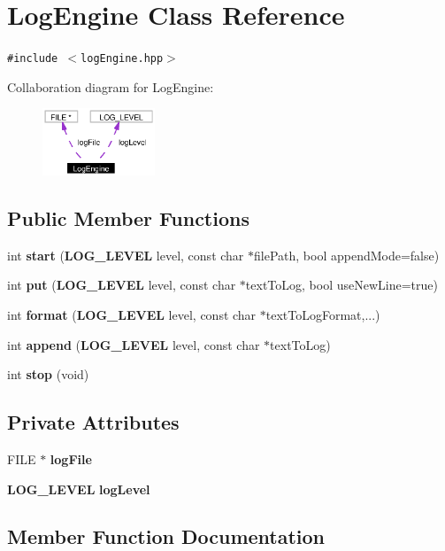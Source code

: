 \section{Log\-Engine Class Reference}
\label{classLogEngine}
{\tt \#include $<$log\-Engine.hpp$>$}

Collaboration diagram for Log\-Engine:\begin{figure}[H]
\begin{center}
\leavevmode
\includegraphics[width=95pt]{classLogEngine__coll__graph}
\end{center}
\end{figure}
\subsection*{Public Member Functions}
\begin{CompactItemize}
\item 
int {\bf start} ({\bf LOG\_\-LEVEL} level, const char $\ast$file\-Path, bool append\-Mode=false)
\item 
int {\bf put} ({\bf LOG\_\-LEVEL} level, const char $\ast$text\-To\-Log, bool use\-New\-Line=true)
\item 
int {\bf format} ({\bf LOG\_\-LEVEL} level, const char $\ast$text\-To\-Log\-Format,...)
\item 
int {\bf append} ({\bf LOG\_\-LEVEL} level, const char $\ast$text\-To\-Log)
\item 
int {\bf stop} (void)
\end{CompactItemize}
\subsection*{Private Attributes}
\begin{CompactItemize}
\item 
FILE $\ast$ {\bf log\-File}
\item 
{\bf LOG\_\-LEVEL} {\bf log\-Level}
\end{CompactItemize}


\subsection{Member Function Documentation}
